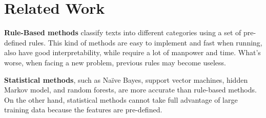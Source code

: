 \documentclass{amsart}
\begin{document}














\section{Related Work} \label{sec-relatedwork}

\textbf{Rule-Based methods} classify texts into different categories using a set of pre-defined rules. This kind of methods are easy to implement and fast when running, also have good interpretability, while require a lot of manpower and time. What's worse, when facing a new problem, previous rules may become useless.

\textbf{Statistical methods}, such as Naïve Bayes, support vector machines, hidden Markov model, and random forests, are more accurate than rule-based methods. On the other hand, statistical methods cannot take full advantage of large training data because the features are pre-defined.
\end{document}
